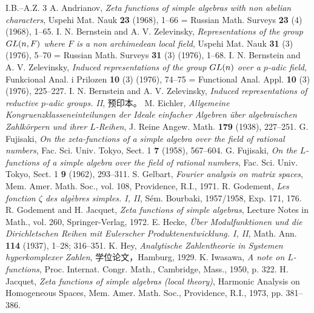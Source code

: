 \begin{thebibliography}{I.B.--A.Z. 3}
 A. Andrianov, \emph{Zeta functions of simple algebras with non abelian characters}, Uspehi Mat. Nauk \textbf{23} (1968), 1--66 = Russian Math. Surveys \textbf{23} (4) (1968), 1--65.
 I. N. Bernstein and A. V. Zelevinsky, \emph{Representations of the group $GL(n,F)$ where $F$ is a non archimedean local field}, Uspehi Mat. Nauk \textbf{31} (3) (1976), 5--70 = Russian Math. Surveys \textbf{31} (3) (1976), 1--68.
 I. N. Bernstein and A. V. Zelevinsky, \emph{Induced representations of the group $GL(n)$ over a $p$-adic field}, Funkcional Anal. i Prilozen \textbf{10} (3) (1976), 74--75 = Functional Anal. Appl. \textbf{10} (3) (1976), 225--227.
 I. N. Bernstein and A. V. Zelevinsky, \emph{Induced representations of reductive $p$-adic groups. II}, 预印本。
 M. Eichler, \emph{Allgemeine Kongruenzklasseneinteilungen der Ideale einfacher Algebren über algebraischen Zahlkörpern und ihrer $L$-Reihen}, J. Reine Angew. Math. \textbf{179} (1938), 227--251.
 G. Fujisaki, \emph{On the zeta-functions of a simple algebra over the field of rational numbers}, Fac. Sci. Univ. Tokyo, Sect. 1 \textbf{7} (1958), 567--604.
 G. Fujisaki, \emph{On the $L$-functions of a simple algebra over the field of rational numbers}, Fac. Sci. Univ. Tokyo, Sect. 1 \textbf{9} (1962), 293--311.
 S. Gelbart, \emph{Fourier analysis on matrix spaces}, Mem. Amer. Math. Soc., vol. 108, Providence, R.I., 1971.
 R. Godement, \emph{Les fonction $\zeta$ des algèbres simples. I, II}, Sém. Bourbaki, 1957/1958, Exp. 171, 176.
 R. Godement and H. Jacquet, \emph{Zeta functions of simple algebras}, Lecture Notes in Math., vol. 260, Springer-Verlag, 1972.
 E. Hecke, \emph{Über Modulfunktionen und die Dirichletschen Reihen mit Eulerscher Produktenentwicklung. I, II}, Math. Ann. \textbf{114} (1937), 1--28; 316--351.
 K. Hey, \emph{Analytische Zahlentheorie in Systemen hyperkomplexer Zahlen}, 学位论文，Hamburg, 1929.
 K. Iwasawa, \emph{A note on $L$-functions}, Proc. Internat. Congr. Math., Cambridge, Mass., 1950, p. 322.
 H. Jacquet, \emph{Zeta functions of simple algebras (local theory)}, Harmonic Analysis on Homogeneous Spaces, Mem. Amer. Math. Soc., Providence, R.I., 1973, pp. 381--386.

\end{thebibliography}
